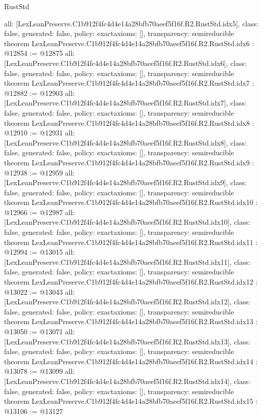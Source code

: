 \begin{lexlean}{RustStd}
\begin{coremodule}
{  all: [LexLeanPreserve.C1b912f4fc4d4e14a28bfb70aeef5f16f.R2.RustStd.idx5],
  class: false,
  generated: false,
  policy: exact{axioms: []},
  transparency: semireducible
}
theorem LexLeanPreserve.C1b912f4fc4d4e14a28bfb70aeef5f16f.R2.RustStd.idx6 : @12854 := @12875 {
  all: [LexLeanPreserve.C1b912f4fc4d4e14a28bfb70aeef5f16f.R2.RustStd.idx6],
  class: false,
  generated: false,
  policy: exact{axioms: []},
  transparency: semireducible
}
theorem LexLeanPreserve.C1b912f4fc4d4e14a28bfb70aeef5f16f.R2.RustStd.idx7 : @12882 := @12903 {
  all: [LexLeanPreserve.C1b912f4fc4d4e14a28bfb70aeef5f16f.R2.RustStd.idx7],
  class: false,
  generated: false,
  policy: exact{axioms: []},
  transparency: semireducible
}
theorem LexLeanPreserve.C1b912f4fc4d4e14a28bfb70aeef5f16f.R2.RustStd.idx8 : @12910 := @12931 {
  all: [LexLeanPreserve.C1b912f4fc4d4e14a28bfb70aeef5f16f.R2.RustStd.idx8],
  class: false,
  generated: false,
  policy: exact{axioms: []},
  transparency: semireducible
}
theorem LexLeanPreserve.C1b912f4fc4d4e14a28bfb70aeef5f16f.R2.RustStd.idx9 : @12938 := @12959 {
  all: [LexLeanPreserve.C1b912f4fc4d4e14a28bfb70aeef5f16f.R2.RustStd.idx9],
  class: false,
  generated: false,
  policy: exact{axioms: []},
  transparency: semireducible
}
theorem LexLeanPreserve.C1b912f4fc4d4e14a28bfb70aeef5f16f.R2.RustStd.idx10 : @12966 := @12987 {
  all: [LexLeanPreserve.C1b912f4fc4d4e14a28bfb70aeef5f16f.R2.RustStd.idx10],
  class: false,
  generated: false,
  policy: exact{axioms: []},
  transparency: semireducible
}
theorem LexLeanPreserve.C1b912f4fc4d4e14a28bfb70aeef5f16f.R2.RustStd.idx11 : @12994 := @13015 {
  all: [LexLeanPreserve.C1b912f4fc4d4e14a28bfb70aeef5f16f.R2.RustStd.idx11],
  class: false,
  generated: false,
  policy: exact{axioms: []},
  transparency: semireducible
}
theorem LexLeanPreserve.C1b912f4fc4d4e14a28bfb70aeef5f16f.R2.RustStd.idx12 : @13022 := @13043 {
  all: [LexLeanPreserve.C1b912f4fc4d4e14a28bfb70aeef5f16f.R2.RustStd.idx12],
  class: false,
  generated: false,
  policy: exact{axioms: []},
  transparency: semireducible
}
theorem LexLeanPreserve.C1b912f4fc4d4e14a28bfb70aeef5f16f.R2.RustStd.idx13 : @13050 := @13071 {
  all: [LexLeanPreserve.C1b912f4fc4d4e14a28bfb70aeef5f16f.R2.RustStd.idx13],
  class: false,
  generated: false,
  policy: exact{axioms: []},
  transparency: semireducible
}
theorem LexLeanPreserve.C1b912f4fc4d4e14a28bfb70aeef5f16f.R2.RustStd.idx14 : @13078 := @13099 {
  all: [LexLeanPreserve.C1b912f4fc4d4e14a28bfb70aeef5f16f.R2.RustStd.idx14],
  class: false,
  generated: false,
  policy: exact{axioms: []},
  transparency: semireducible
}
theorem LexLeanPreserve.C1b912f4fc4d4e14a28bfb70aeef5f16f.R2.RustStd.idx15 : @13106 := @13127 {
}
\end{coremodule}
\end{lexlean}
